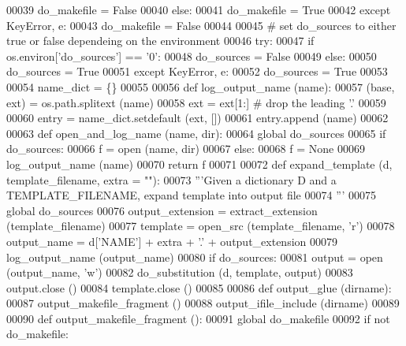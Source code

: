\begin{DoxyCode}
00039         do\_makefile = \textcolor{keyword}{False}
00040     \textcolor{keywordflow}{else}:
00041         do\_makefile = \textcolor{keyword}{True}
00042 \textcolor{keywordflow}{except} KeyError, e:
00043     do\_makefile = \textcolor{keyword}{False}
00044 
00045 \textcolor{comment}{# set do\_sources to either true or false dependeing on the environment}
00046 \textcolor{keywordflow}{try}:
00047     \textcolor{keywordflow}{if} os.environ[\textcolor{stringliteral}{'do\_sources'}] == \textcolor{stringliteral}{'0'}:
00048         do\_sources = \textcolor{keyword}{False}
00049     \textcolor{keywordflow}{else}:
00050         do\_sources = \textcolor{keyword}{True}
00051 \textcolor{keywordflow}{except} KeyError, e:
00052     do\_sources = \textcolor{keyword}{True}
00053 
00054 name\_dict = \{\}
00055 
00056 \textcolor{keyword}{def }log_output_name (name):
00057     (base, ext) = os.path.splitext (name)
00058     ext = ext[1:]                       \textcolor{comment}{# drop the leading '.'}
00059 
00060     entry = name\_dict.setdefault (ext, [])
00061     entry.append (name)
00062 
00063 \textcolor{keyword}{def }open_and_log_name (name, dir):
00064     \textcolor{keyword}{global} do\_sources
00065     \textcolor{keywordflow}{if} do\_sources:
00066         f = open (name, dir)
00067     \textcolor{keywordflow}{else}:
00068         f = \textcolor{keywordtype}{None}
00069     log\_output\_name (name)
00070     \textcolor{keywordflow}{return} f
00071 
00072 \textcolor{keyword}{def }expand_template (d, template\_filename, extra = ""):
00073     \textcolor{stringliteral}{'''Given a dictionary D and a TEMPLATE\_FILENAME, expand template into output file}
00074 \textcolor{stringliteral}{    '''}
00075     \textcolor{keyword}{global} do\_sources
00076     output\_extension = extract\_extension (template\_filename)
00077     template = open\_src (template\_filename, \textcolor{stringliteral}{'r')}
00078 \textcolor{stringliteral}{    output\_name = d['NAME'}] + extra + \textcolor{stringliteral}{'.'} + output\_extension
00079     log\_output\_name (output\_name)
00080     \textcolor{keywordflow}{if} do\_sources:
00081         output = open (output\_name, \textcolor{stringliteral}{'w'})
00082         do\_substitution (d, template, output)
00083         output.close ()
00084     template.close ()
00085 
00086 \textcolor{keyword}{def }output_glue (dirname):
00087     output\_makefile\_fragment ()
00088     output\_ifile\_include (dirname)
00089 
00090 \textcolor{keyword}{def }output_makefile_fragment ():
00091     \textcolor{keyword}{global} do\_makefile
00092     \textcolor{keywordflow}{if} \textcolor{keywordflow}{not} do\_makefile:

\end{DoxyCode}
